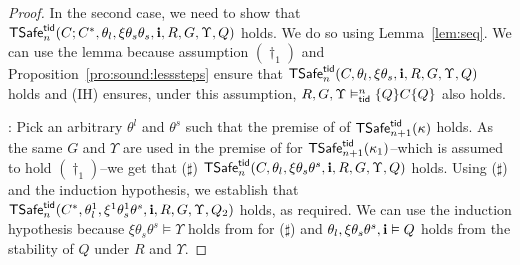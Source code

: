 \begin{proof}

In the second case, 
we need to show that ${\sf TSafe}^{{\sf tid}}_n(C;C^*,\theta_l,\xi\theta_s\theta_s,{\bf i},R,G,\Upsilon, Q)$ holds.
We do so using Lemma~\ref{lem:seq}. 
We can use the lemma because assumption $(\dag_1)$ and Proposition~\ref{pro:sound:lesssteps} 
ensure that 
${\sf TSafe}^{{\sf tid}}_{n}(C,\theta_l,\xi\theta_s,{\bf i},R,G,\Upsilon, Q)$ holds
and (IH) ensures, under this assumption, 
$R,G,\Upsilon \vDash^n_{{\sf tid}} \{Q\} C \{ Q \}$ also holds.

: 
Pick an arbitrary $\theta^l$ and $\theta^s$ such that the 
premise of  of ${\sf TSafe}^{{\sf tid}}_{n+1}(\kappa)$ holds. 
As the same $G$ and $\Upsilon$ are used in the premise of 
 for ${\sf TSafe}^{{\sf tid}}_{n+1}(\kappa_1)$--which is assumed to 
hold $(\dag_1)$--we get that ($\sharp$)
${\sf TSafe}^{{\sf tid}}_n(C,\theta_l,\xi\theta_s\theta^s,{\bf i},R,G,\Upsilon, Q)$
holds.
Using ($\sharp$) and the induction hypothesis, we establish that 
${\sf TSafe}^{{\sf tid}}_n(C^*, \theta^1_l,\xi^1\theta^1_s\theta^s,{\bf i},R,G,\Upsilon, Q_2)$
holds, as required.
We can use the induction hypothesis because 
$\xi\theta_s\theta^s\vDash\Upsilon$ holds from  for ($\sharp$) and
$\theta_l,\xi\theta_s\theta^s,{\bf i}\vDash Q$ holds  from the stability of $Q$ under $R$ and $\Upsilon$.
 

\end{proof}
